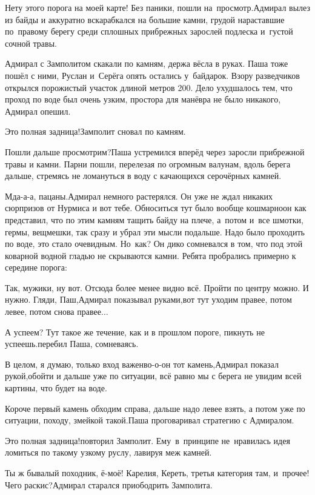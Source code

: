 \diagdash Нету этого порога на моей карте! Без паники, пошли на~просмотр.\mdash Адмирал вылез из байды и аккуратно вскарабкался на большие камни, грудой нараставшие по~правому берегу среди сплошных прибрежных зарослей подлеска и~густой сочной травы.

Адмирал с Замполитом скакали по камням, держа вёсла в руках. Паша тоже пошёл с ними, Руслан и~Серёга опять остались у~байдарок. Взору разведчиков открылся порожистый участок длиной метров 200. Дело ухудшалось тем, что проход по воде был очень узким, простора для манёвра не было никакого, Адмирал опешил.

\diagdash Это полная задница!\mdash Замполит сновал по камням.

\diagdash Пошли дальше просмотрим?\mdash Паша устремился вперёд через заросли прибрежной травы и камни. Парни пошли, перелезая по огромным валунам, вдоль берега дальше, стремясь не ломануться в воду с качающихся серо\sdash чёрных камней.

\diagdash Мда-а-а, пацаны.\mdash Адмирал немного растерялся. Он уже не ждал никаких сюрпризов от Нурмиса и вот тебе. Обноситься тут было вообще кошмарно\mdash он как представил, что по этим камням тащить байду на плече, а~потом и~все шмотки, гермы, вещмешки, так сразу и убрал эти мысли подальше. Надо было проходить по воде, это стало очевидным. Но~как? Он дико сомневался в том, что под этой коварной водной гладью не скрываются камни. Ребята пробрались примерно к середине порога:

\diagdash Так, мужики, ну вот. Отсюда более менее видно всё. Пройти по центру можно. И нужно. Гляди, Паш,\mdash Адмирал показывал руками,\mdash вот тут уходим правее, потом левее, потом снова правее$\ldots$

\diagdash А успеем? Тут такое же течение, как и в прошлом пороге, пикнуть не успеешь.\mdash перебил Паша, сомневаясь.

\diagdash В целом, я думаю, только вход важен\mdash во-о-он тот камень,\mdash Адмирал показал рукой,\mdash обойти и дальше уже по ситуации, всё равно мы с берега не увидим всей картины, что будет на воде.

\diagdash Короче первый камень обходим справа, дальше надо левее взять, а потом уже по ситуации, походу, змейкой такой.\mdash Паша проговаривал стратегию с Адмиралом. 

\diagdash Это полная задница!\mdash повторил Замполит. Ему~в~принципе не~нравилась идея ломиться по такому узкому руслу, лавируя меж камней.

\diagdash Ты ж бывалый походник, ё-моё! Карелия, Кереть, третья категория там, и~прочее! Чего раскис?\mdash Адмирал старался приободрить Замполита.

